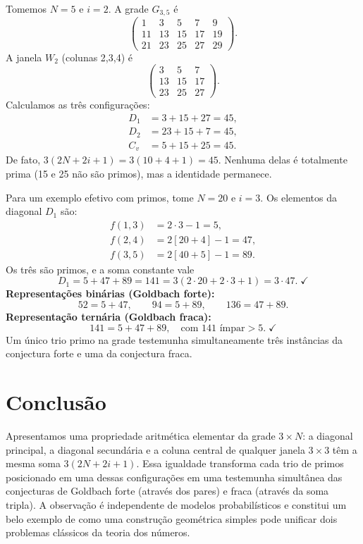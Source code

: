 \documentclass[12pt, a4paper]{article}
\begin{document}
	Tomemos $N=5$ e $i=2$. A grade $G_{3,5}$ é
	\[
	\begin{pmatrix}
		1 & 3 & 5 & 7 & 9\\
		11 & 13 & 15 & 17 & 19\\
		21 & 23 & 25 & 27 & 29
	\end{pmatrix}.
	\]
	A janela $W_2$ (colunas 2,3,4) é
	\[
	\begin{pmatrix}
		3 & 5 & 7\\
		13 & 15 & 17\\
		23 & 25 & 27
	\end{pmatrix}.
	\]
	Calculamos as três configurações:
	\begin{align*}
		D_1 &= 3+15+27 = 45,\\
		D_2 &= 23+15+7 = 45,\\
		C_v &= 5+15+25 = 45.
	\end{align*}
	De fato, $3(2N+2i+1)=3(10+4+1)=45$. Nenhuma delas é totalmente prima (15 e 25 não são primos), mas a identidade permanece.
	
	Para um exemplo efetivo com primos, tome $N=20$ e $i=3$. Os elementos da diagonal $D_1$ são:
	\begin{align*}
		f(1,3) &= 2\cdot 3 - 1 = 5,\\
		f(2,4) &= 2[20+4]-1 = 47,\\
		f(3,5) &= 2[40+5]-1 = 89.
	\end{align*}
	Os três são primos, e a soma constante vale
	\[
	D_1 = 5 + 47 + 89 = 141 = 3(2\cdot 20 + 2\cdot 3 + 1) = 3\cdot 47.\;\checkmark
	\]
	\textbf{Representações binárias (Goldbach forte):}
	\[
	52 = 5+47,\qquad 94 = 5+89,\qquad 136 = 47+89.
	\]
	\textbf{Representação ternária (Goldbach fraca):}
	\[
	141 = 5 + 47 + 89,\quad \text{com } 141 \text{ ímpar} > 5.\;\checkmark
	\]
	Um único trio primo na grade testemunha simultaneamente três instâncias da conjectura forte e uma da conjectura fraca.
	
	\section{Conclusão}
	
	Apresentamos uma propriedade aritmética elementar da grade $3\times N$: a diagonal principal, a diagonal secundária e a coluna central de qualquer janela $3\times 3$ têm a mesma soma $3(2N+2i+1)$. Essa igualdade transforma cada trio de primos posicionado em uma dessas configurações em uma testemunha simultânea das conjecturas de Goldbach forte (através dos pares) e fraca (através da soma tripla). A observação é independente de modelos probabilísticos e constitui um belo exemplo de como uma construção geométrica simples pode unificar dois problemas clássicos da teoria dos números.
	
\end{document}
